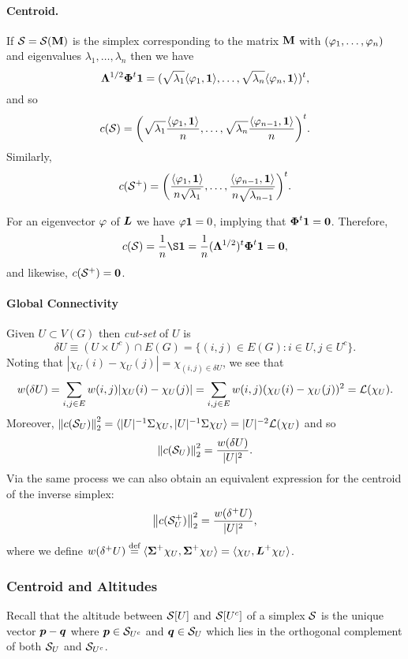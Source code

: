 \paragraph{Centroid.}
If $\mathcal{S}=\mathcal{S}(\vb{M})$ is the simplex corresponding to the matrix $\vb{M}$ with  $(\varphi_1,\dots,\varphi_n)$ and eigenvalues $\lambda_1,\dots,\lambda_n$ then we have
\[\vb{\Lambda}^{1/2}\boldsymbol{\Phi}^t\vb{1} = (\sqrt{\lambda_1}\langle \varphi_1,\vb{1}\rangle , \dots, \sqrt{\lambda_{n}}\langle \varphi_{n},\vb{1}\rangle)^t ,\]
and so 
\[c(\mathcal{S}) = \bigg(\sqrt{\lambda_1}\frac{\langle \varphi_1,\vb{1}\rangle}{n }, \dots, \sqrt{\lambda_{n}}\frac{\langle \varphi_{n-1},\vb{1}\rangle}{n}\bigg)^t. \]
Similarly, 
\[c(\mathcal{S}^+) = \bigg(\frac{\langle \varphi_1,\vb{1}\rangle}{n\sqrt{\lambda_1} }, \dots, \frac{\langle \varphi_{n-1},\vb{1}\rangle}{n\sqrt{\lambda_{n-1}}}\bigg)^t.\]

For an eigenvector $\varphi$ of $\vb*{L}$ we have $\varphi\vb{1}=0$, implying that $\boldsymbol{\Phi}^t\vb{1}=\vb{0}$. Therefore, 
\[c(\splx) = \frac{1}{n}\S\one = \frac{1}{n}(\Eval^{1/2})^\tp \Eig^\tp \one = \zero, \]
and likewise, $c(\mathcal{S}^+)=\vb{0}$.

\paragraph{Global Connectivity}
Given $U\subset V(G)$ then \emph{cut-set} of $U$ is 
\[\delta U \equiv (U\times U^c)\cap E(G)= \{(i,j)\in E(G): i\in U, j\in U^c\}.\]
Noting that $|\chi_U(i)-\chi_U(j)|=\chi_{(i,j)\in \delta U}$, we see that
\begin{align*}
    w(\delta U) = \sum_{i,j\in E} w(i,j)|\chi_U(i)-\chi_U(j)| = \sum_{i,j\in E} w(i,j)(\chi_U(i)-\chi_U(j))^2 = \mathcal{L}(\chi_U). 
\end{align*}
Moreover, $\norm{c(\mathcal{S}_U)}^2_2 = \langle |U|^{-1} \Sigma\chi_U,|U|^{-1} \Sigma\chi_U\rangle = |U|^{-2} \mathcal{L}(\chi_U)$ and so 
\begin{equation}
\label{eq:c(S_U)}
    \norm{c(\mathcal{S}_U)}_2^2 = \frac{w(\delta U)}{|U|^2}.
\end{equation}
Via the same process we can also obtain an equivalent expression for the centroid of the inverse simplex: 
\begin{equation}
\label{eq:c(S+_U)}
    \norm{c(\mathcal{S}^+_U)}_2^2 = \frac{w(\delta^+ U)}{|U|^2},
\end{equation}
where we define $w(\delta^+U) \overset{\text{def}}{=}  \langle \boldsymbol{\Sigma}^+\chi_U,\boldsymbol{\Sigma}^+\chi_U\rangle=\langle \chi_U,\vb*{L}^+\chi_U\rangle$. 




\subsubsection{Centroid and Altitudes}
Recall that the altitude between $\mathcal{S}[U]$ and $\mathcal{S}[U^c]$ of a simplex $\mathcal{S}$ is the unique vector $\vb*{p}-\vb*{q}$ where  $\vb*{p}\in \mathcal{S}_{U^c}$ and $\vb*{q}\in\mathcal{S}_{U}$ which lies in the orthogonal complement of both $\mathcal{S}_U$ and $\mathcal{S}_{U^c}$. 

